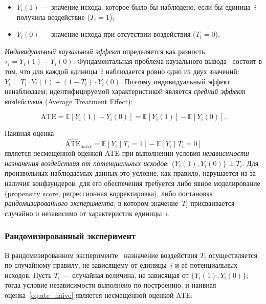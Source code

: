 \begin{itemize}
    \item $Y_i(1)$ --- значение исхода, которое было бы наблюдено, если бы единица~$i$ получила воздействие ($T_i = 1$);
    \item $Y_i(0)$ --- значение исхода при отсутствии воздействия ($T_i = 0$).
\end{itemize}

\emph{Индивидуальный каузальный эффект} определяется как разность $\tau_i = Y_i(1) - Y_i(0)$. Фундаментальная проблема каузального вывода~\cite{rubin1974} состоит в том, что для каждой единицы~$i$ наблюдается ровно одно из двух значений: $Y_i = T_i \cdot Y_i(1) + (1 - T_i) \cdot Y_i(0)$. Поэтому индивидуальный эффект ненаблюдаем; идентифицируемой характеристикой является \emph{средний эффект воздействия} (Average Treatment Effect):

\begin{equation}
    \mathrm{ATE} = \mathbb{E}[Y_i(1) - Y_i(0)] = \mathbb{E}[Y_i(1)] - \mathbb{E}[Y_i(0)].
\end{equation}

Наивная оценка
\begin{equation}
    \widehat{\mathrm{ATE}}_{\text{naive}} = \mathbb{E}[Y_i \mid T_i = 1] - \mathbb{E}[Y_i \mid T_i = 0]
    \label{eq:ate_naive}
\end{equation}
является несмещённой оценкой ATE при выполнении условия \emph{независимости назначения воздействия от потенциальных исходов}: $\{Y_i(1), Y_i(0)\} \perp T_i$. Для произвольных наблюдаемых данных это условие, как правило, нарушается из-за наличия конфаундеров; для его обеспечения требуется либо явное моделирование (propensity score, регрессионная корректировка), либо постановка \emph{рандомизированного эксперимента}, в котором значение~$T_i$ присваивается случайно и независимо от характеристик единицы~$i$.

\subsubsection{Рандомизированный эксперимент}

В рандомизированном эксперименте~\cite{splawa1923, imbens2015causal} назначение воздействия $T_i$ осуществляется по случайному правилу, не зависящему от единицы~$i$ и её потенциальных исходов. Пусть $T_i$ --- случайная величина, не зависящая от $\{Y_i(1), Y_i(0)\}$; тогда условие независимости выполнено по построению, и наивная оценка~\eqref{eq:ate_naive} является несмещённой оценкой ATE:

